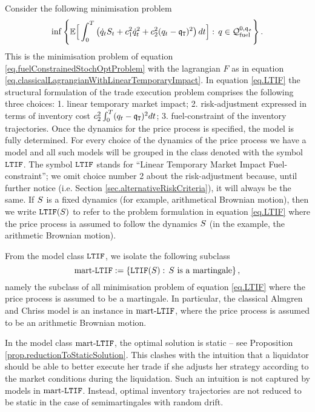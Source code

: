 \documentclass[10pt,a4paper]{article}
\begin{document}
Consider the following minimisation problem 
\begin{equation}\label{eq.LTIF}
\inf \left\lbrace
\mathbb{{E}}  \Big[ 
\int_{0}^{T} 
\left(
\dot{q}_t S_t + c_{1}^{2} \dot{q}_{t}^{2} + c_{2} ^{2} (q_t - \mathfrak{q}_{\mathtt{T} })^{2} 
\right) 
 dt
 \Big]
 : \, q \in \mathcal{Q}_{\text{fuel}}^{0,\mathfrak{q_0}}
\right\rbrace.
\end{equation}
This is the minimisation problem of equation \eqref{eq.fuelConstrainedStochOptProblem} with the lagrangian $F$ as in equation \eqref{eq.classicalLagrangianWithLinearTemporaryImpact}. In equation \eqref{eq.LTIF} the structural formulation of the trade execution problem comprises the following three choices: 1. linear temporary market impact; 2. risk-adjustment expressed in terms of inventory cost $c_{2} ^{2} \int_{0}^{T} (q_t - \mathfrak{q}_{\mathtt{T} }) ^{2} dt$; 3. fuel-constraint of the inventory trajectories. Once the dynamics for the price process is specified, the model is fully determined. For every choice of the dynamics of the price process we have a model and all such models will be grouped in the class denoted with the symbol $\mathtt{LTIF}$. The symbol $\mathtt{LTIF}$   stands for ``Linear Temporary Market Impact Fuel-constraint''; we omit choice number 2 about the risk-adjustment because, until further notice (i.e. Section \ref{sec.alternativeRiskCriteria}), it will always be the same.  If $S$ is a fixed dynamics (for example, arithmetical Brownian motion), then we write $\mathtt{LTIF}(S)$ to refer to the problem formulation in equation \eqref{eq.LTIF} where the price process ia assumed to follow the dynamics $S$ (in the example, the arithmetic Brownian motion).

From the model class $\mathtt{LTIF}$, we isolate the following subclass 
\begin{equation*}
\text{mart-}\mathtt{LTIF}:=\left\lbrace
\mathtt{LTIF}(S): \, S \text{  is a martingale}
\right\rbrace,
\end{equation*}
namely the subclass of all minimisation problem of equation \eqref{eq.LTIF} where the price process is assumed to be a martingale. In particular, the classical Almgren and Chriss model is an instance in $\text{mart-}\mathtt{LTIF}$, where the price process is assumed to be an arithmetic Brownian motion. 

In the model class $\text{mart-}\mathtt{LTIF}$, the optimal solution is static -- see Proposition \ref{prop.reductionToStaticSolution}. This clashes with the intuition that a liquidator should be able to better execute her trade if  she adjusts her strategy according to the market conditions during the liquidation. Such an intuition is not captured by models in $\text{mart-}\mathtt{LTIF}$. Instead, optimal inventory trajectories are not reduced to be static in the case of semimartingales with random drift. 
\end{document}
